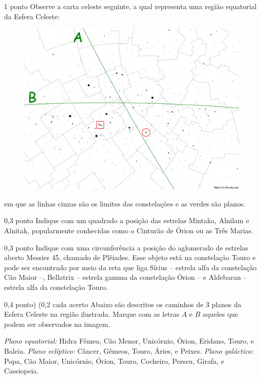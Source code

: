 \documentclass{../lista}
\begin{document}
	\begin{questao}{1 ponto}
		Observe a carta celeste seguinte, a qual representa uma região equatorial da Esfera Celeste:
		\begin{figure}[H]
			\centering
			\includegraphics[scale=0.5]{./img/4.png}
		\end{figure}
		em que as linhas cinzas são os limites das constelações e as verdes são planos.

		\begin{pergunta}{0,3 ponto}
			Indique com um quadrado a posição das estrelas Mintaka, Alnilam e Alnitak, popularmente conhecidas como o Cinturão de Órion ou as Três Marias.
		\end{pergunta}

		\begin{pergunta}{0,3 ponto}
			Indique com uma circunferência a posição do aglomerado de estrelas aberto Messier 45, chamado de Plêiades. Esse objeto está na constelação Touro e pode ser encontrado por meio da reta que liga Sírius -- estrela alfa da constelação Cão Maior --, Bellatrix -- estrela gamma da constelação Órion -- e Aldebaran -- estrela alfa da constelação Touro.
		\end{pergunta}

		\begin{pergunta}{0,4 ponto) (0,2 cada acerto}
			Abaixo são descritos os caminhos de 3 planos da Esfera Celeste na região ilustrada. Marque com as letras $A$ e $B$ aqueles que podem ser observados na imagem.
			\begin{alternativas}
				\item \textit{Plano equatorial:} Hidra Fêmea, Cão Menor, Unicórnio, Órion, Eridano, Touro, e Baleia.
				\alternativaMarcada[$\red{A}$] \textit{Plano eclíptico:} Câncer, Gêmeos, Touro, Áries, e Peixes.
				\alternativaMarcada[$\red{B}$] \textit{Plano galáctico:} Popa, Cão Maior, Unicórnio, Órion, Touro, Cocheiro, Perseu, Girafa, e Cassiopeia.
			\end{alternativas}
		\end{pergunta}
	\end{questao}
\end{document}
